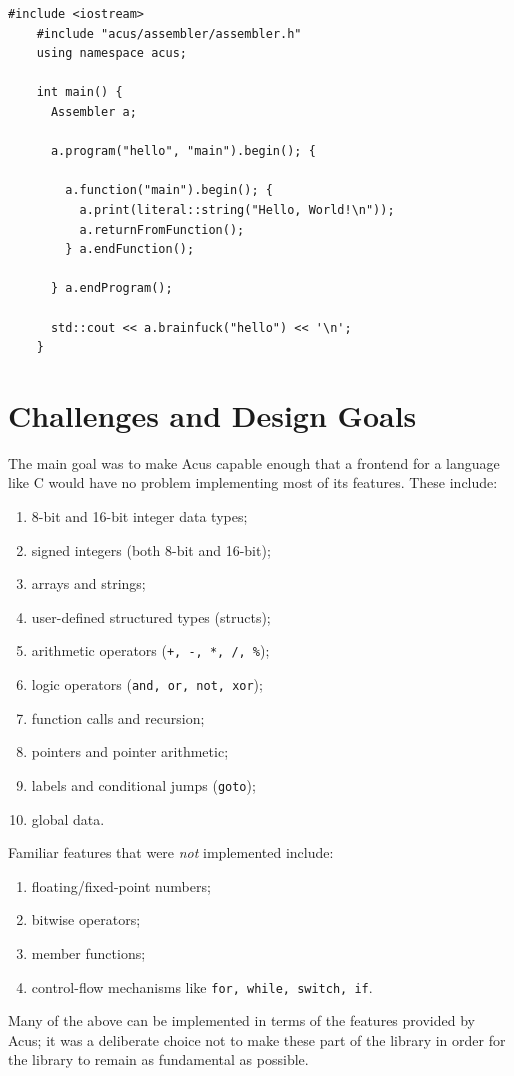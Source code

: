 \begin{lstfloat}[H]
  \begin{lstlisting}[style=cpp]
    #include <iostream>
    #include "acus/assembler/assembler.h"
    using namespace acus;

    int main() {
      Assembler a;

      a.program("hello", "main").begin(); {

        a.function("main").begin(); {
          a.print(literal::string("Hello, World!\n"));
          a.returnFromFunction();
        } a.endFunction();

      } a.endProgram();
      
      std::cout << a.brainfuck("hello") << '\n';
    }
  \end{lstlisting}
  \caption{C++ code that calls into the Acus-library to produce an executable that outputs BF source code for a \emph{Hello World} program.}
  \label{lst:acushello}
\end{lstfloat}


\section{Challenges and Design Goals}
\label{sec:compilation:designgoals}
The main goal was to make Acus capable enough that a frontend for a language like C would have no problem implementing most of its features. These include:
%
\begin{enumerate} \itemsep0em 
\item 8-bit and 16-bit integer data types;
\item signed integers (both 8-bit and 16-bit);
\item arrays and strings;
\item user-defined structured types (structs);
\item arithmetic operators (\texttt{+, -, *, /, \%});
\item logic operators (\texttt{and, or, not, xor});
\item function calls and recursion;
\item pointers and pointer arithmetic;
\item labels and conditional jumps (\texttt{goto});
\item global data.
\end{enumerate}
%
Familiar features that were \emph{not} implemented include:
\begin{enumerate} \itemsep0em 
\item floating/fixed-point numbers;
\item bitwise operators;
\item member functions;
\item control-flow mechanisms like \texttt{for, while, switch, if}.
\end{enumerate}
%
Many of the above can be implemented in terms of the features provided by Acus; it was a deliberate choice not to make these part of the library in order for the library to remain as fundamental as possible.

